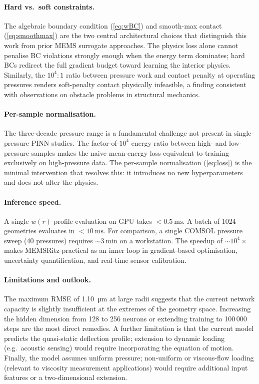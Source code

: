 \documentclass[review,12pt]{elsarticle}
\begin{document}
\paragraph{Hard vs.\ soft constraints.}
The algebraic boundary condition (\cref{eq:wBC}) and smooth-max contact
(\cref{eq:smoothmax}) are the two central architectural choices that
distinguish this work from prior MEMS surrogate approaches. The physics loss
alone cannot penalise BC violations strongly enough when the energy term
dominates; hard BCs redirect the full gradient budget toward learning the
interior physics. Similarly, the $10^4:1$ ratio between pressure work and
contact penalty at operating pressures renders soft-penalty contact
physically infeasible, a finding consistent with observations on obstacle
problems in structural mechanics.

\paragraph{Per-sample normalisation.}
The three-decade pressure range is a fundamental challenge not present in
single-pressure PINN studies. The factor-of-$10^4$ energy ratio between high-
and low-pressure samples makes the naive mean-energy loss equivalent to
training exclusively on high-pressure data. The per-sample normalisation
(\cref{eq:loss}) is the minimal intervention that resolves this: it introduces
no new hyperparameters and does not alter the physics.

\paragraph{Inference speed.}
A single $w(r)$ profile evaluation on GPU takes $<\SI{0.5}{\milli\second}$.
A batch of 1024 geometries evaluates in $<\SI{10}{\milli\second}$. For
comparison, a single COMSOL pressure sweep (40 pressures) requires
$\sim\SI{3}{\minute}$ on a workstation. The speedup of $\sim 10^4\times$
makes MEMSRitz practical as an inner loop in gradient-based optimisation,
uncertainty quantification, and real-time sensor calibration.

\paragraph{Limitations and outlook.}
The maximum RMSE of \SI{1.10}{\micro\metre} at large radii suggests that the
current network capacity is slightly insufficient at the extremes of the
geometry space. Increasing the hidden dimension from 128 to 256 neurons or
extending training to 100\,000 steps are the most direct remedies. A further
limitation is that the current model predicts the quasi-static deflection
profile; extension to dynamic loading (e.g.\ acoustic sensing) would require
incorporating the equation of motion. Finally, the model assumes uniform
pressure; non-uniform or viscous-flow loading (relevant to viscosity
measurement applications) would require additional input features or a
two-dimensional extension.
\end{document}
